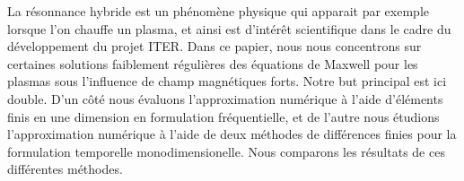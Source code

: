 La r\'esonnance hybride est un ph\'enom\`ene physique qui apparait par exemple lorsque l'on chauffe un plasma, et 
ainsi est d'int\'er\^et scientifique dans le cadre du d\'eveloppement  du projet ITER. Dans ce papier, nous nous concentrons sur certaines  solutions faiblement r\'eguli\`eres des \'equations de Maxwell pour les plasmas sous l'influence de champ magn\'etiques forts. Notre but principal est ici double. D'un c\^ot\'e nous \'evaluons l'approximation 
num\'erique \`a l'aide d'\'el\'ements finis en une dimension en formulation 
fr\'equentielle, et de l'autre nous \'etudions l'approximation num\'erique \`a l'aide de deux m\'ethodes de  diff\'erences finies pour la formulation
temporelle monodimensionelle. Nous comparons les r\'esultats de ces  diff\'erentes m\'ethodes.